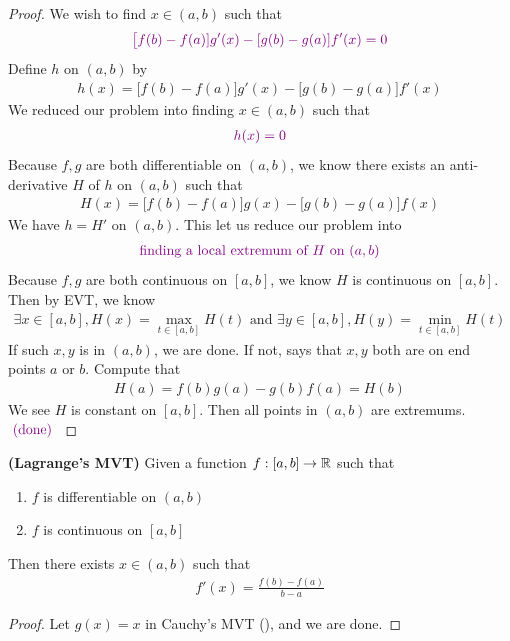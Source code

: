 \documentclass{report}
\begin{document}
\begin{proof}
We wish to find $x \in (a,b)$ such that  
\begin{align*}
\textcolor{violet}{\big[f(b)-f(a)]g'(x)-[g(b)-g(a)]f'(x)=0}
\end{align*}
Define $h$ on  $(a,b)$ by 
\begin{align*}
h(x)=\big[f(b)-f(a)\big]g'(x)-\big[g(b)-g(a)\big]f'(x)
\end{align*}
We reduced our problem into finding $x \in (a,b)$ such that 
\begin{align*}
\textcolor{violet}{h(x)=0}
\end{align*}
Because $f,g$ are both differentiable on  $(a,b)$, we know there exists an anti-derivative $H$ of  $h$ on  $(a,b)$ such that
\begin{align*}
H(x)=\big[f(b) -f(a)\big]g(x)-\big[g(b)-g(a) \big]f(x)
\end{align*}
We have $h=H'$ on  $(a,b)$. This let us reduce our problem into 
\begin{align*}
  \textcolor{violet}{\text{ finding a local extremum of $H$ on  $(a,b)$ }}
\end{align*}
Because $f,g$ are both continuous  on  $[a,b]$, we know $H$ is continuous on $[a,b]$. Then by EVT, we know 
 \begin{align*}
\exists x \in [a,b] , H(x)=\max_{t \in [a,b]}H(t)\text{ and }\exists y \in [a,b], H(y)=\min_{t \in [a,b]}H(t)
\end{align*}
If such $x,y$ is in $(a,b)$, we are done. If not, says that $x,y$ both are on end points $a$ or  $b$. Compute that 
\begin{align*}
H(a)=f(b)g(a)-g(b)f(a)=H(b)
\end{align*}
We see $H$ is constant on  $[a,b]$. Then all points in $(a,b)$ are extremums. $\textcolor{violet}{\text{ (done) }}$
\end{proof}
\begin{corollary}
\label{MVT}
\textbf{(Lagrange's MVT)} Given a function $f:[a,b]\rightarrow \mathbb{R}$ such that 
\begin{enumerate}[label=(\alph*)]
  \item $f$ is differentiable on  $(a,b)$ 
  \item $f$ is continuous on  $[a,b]$
\end{enumerate}
Then there exists $x \in (a,b)$ such that 
\begin{align*}
f'(x)=\frac{f(b)-f(a)}{b-a}
\end{align*}
\end{corollary}
\begin{proof}
Let $g(x)=x$ in Cauchy's MVT (), and we are done.
\end{proof}
\end{document}
